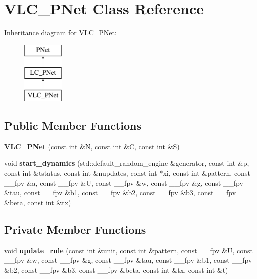 \hypertarget{classVLC__PNet}{}\section{V\+L\+C\+\_\+\+P\+Net Class Reference}
\label{classVLC__PNet}
Inheritance diagram for V\+L\+C\+\_\+\+P\+Net\+:\begin{figure}[H]
\begin{center}
\leavevmode
\includegraphics[height=3.000000cm]{classVLC__PNet}
\end{center}
\end{figure}
\subsection*{Public Member Functions}
\begin{DoxyCompactItemize}
\item 
{\bfseries V\+L\+C\+\_\+\+P\+Net} (const int \&N, const int \&C, const int \&S)\hypertarget{classVLC__PNet_a4c7e1b428ce72022e20ed2c7c05fc599}{}\label{classVLC__PNet_a4c7e1b428ce72022e20ed2c7c05fc599}

\item 
void {\bfseries start\+\_\+dynamics} (std\+::default\+\_\+random\+\_\+engine \&generator, const int \&p, const int \&tstatus, const int \&nupdates, const int $\ast$xi, const int \&pattern, const \+\_\+\+\_\+fpv \&a, const \+\_\+\+\_\+fpv \&U, const \+\_\+\+\_\+fpv \&w, const \+\_\+\+\_\+fpv \&g, const \+\_\+\+\_\+fpv \&tau, const \+\_\+\+\_\+fpv \&b1, const \+\_\+\+\_\+fpv \&b2, const \+\_\+\+\_\+fpv \&b3, const \+\_\+\+\_\+fpv \&beta, const int \&tx)\hypertarget{classVLC__PNet_a8df456c85a7e6a0319a14c18f014a7d4}{}\label{classVLC__PNet_a8df456c85a7e6a0319a14c18f014a7d4}

\end{DoxyCompactItemize}
\subsection*{Private Member Functions}
\begin{DoxyCompactItemize}
\item 
void {\bfseries update\+\_\+rule} (const int \&unit, const int \&pattern, const \+\_\+\+\_\+fpv \&U, const \+\_\+\+\_\+fpv \&w, const \+\_\+\+\_\+fpv \&g, const \+\_\+\+\_\+fpv \&tau, const \+\_\+\+\_\+fpv \&b1, const \+\_\+\+\_\+fpv \&b2, const \+\_\+\+\_\+fpv \&b3, const \+\_\+\+\_\+fpv \&beta, const int \&tx, const int \&t)\hypertarget{classVLC__PNet_a59ab7988f2180850a5cb8c74b89a0946}{}\label{classVLC__PNet_a59ab7988f2180850a5cb8c74b89a0946}

\end{DoxyCompactItemize}
